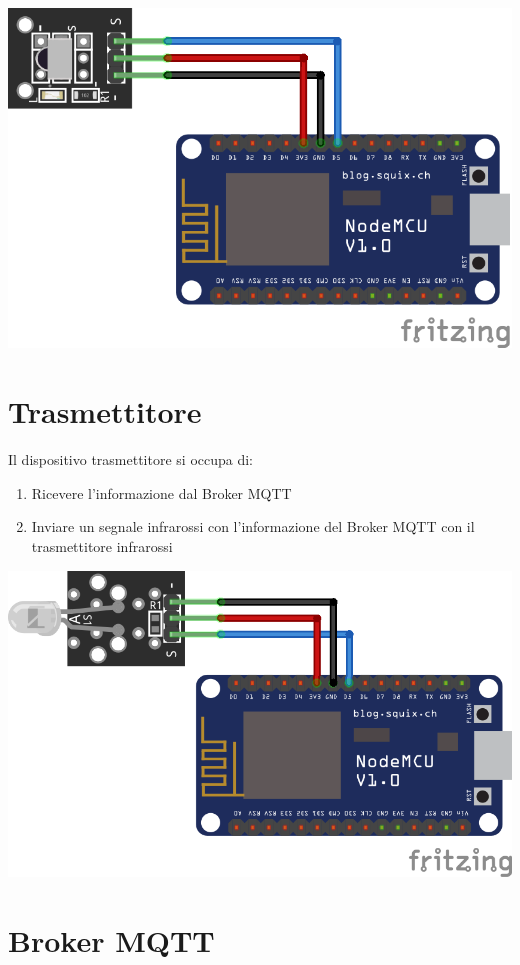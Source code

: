 \documentclass[a4paper]{article}
\begin{document}
\includegraphics[width=\textwidth,height=\textheight,keepaspectratio]{assets/receiver_fritzing}

\section{Trasmettitore}
Il dispositivo trasmettitore si occupa di:

\begin{enumerate}
    \item Ricevere l'informazione dal Broker MQTT
    \item Inviare un segnale infrarossi con l'informazione del Broker MQTT con il trasmettitore infrarossi
\end{enumerate}

\includegraphics[width=\textwidth,height=\textheight,keepaspectratio]{assets/transmitter_fritzing}

\section{Broker MQTT}
\end{document}
